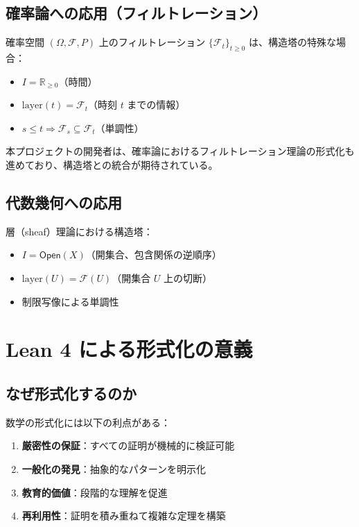 \documentclass[a4paper,11pt]{ltjsarticle}
\begin{document}
\subsection{確率論への応用（フィルトレーション）}

確率空間 $(\Omega, \mathcal{F}, P)$ 上のフィルトレーション $\{\mathcal{F}_t\}_{t \geq 0}$ は、構造塔の特殊な場合：
\begin{itemize}
\item $I = \mathbb{R}_{\geq 0}$（時間）
\item $\text{layer}(t) = \mathcal{F}_t$（時刻 $t$ までの情報）
\item $s \leq t \Rightarrow \mathcal{F}_s \subseteq \mathcal{F}_t$（単調性）
\end{itemize}

\begin{remarkbox}[title=最新の研究との接続]
本プロジェクトの開発者は、確率論におけるフィルトレーション理論の形式化も進めており、構造塔との統合が期待されている。
\end{remarkbox}

\subsection{代数幾何への応用}

層（sheaf）理論における構造塔：
\begin{itemize}
\item $I = \mathsf{Open}(X)$（開集合、包含関係の逆順序）
\item $\text{layer}(U) = \mathcal{F}(U)$（開集合 $U$ 上の切断）
\item 制限写像による単調性
\end{itemize}

\newpage

\section{Lean 4 による形式化の意義}

\subsection{なぜ形式化するのか}

数学の形式化には以下の利点がある：

\begin{enumerate}
\item \textbf{厳密性の保証}：すべての証明が機械的に検証可能
\item \textbf{一般化の発見}：抽象的なパターンを明示化
\item \textbf{教育的価値}：段階的な理解を促進
\item \textbf{再利用性}：証明を積み重ねて複雑な定理を構築
\end{enumerate}
\end{document}
